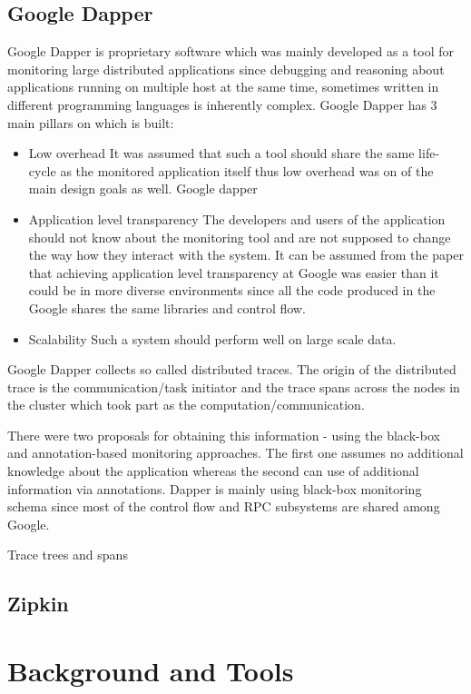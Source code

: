 \subsection{Google Dapper}
Google Dapper is proprietary software which was mainly developed as a tool for monitoring large distributed applications since debugging and reasoning about applications running on multiple host at the same time, sometimes written in different programming languages is inherently complex. Google Dapper has 3 main pillars on which is built:
\begin{itemize}
	\item Low overhead
	It was assumed that such a tool should share the same life-cycle as the monitored application itself thus low overhead was on of the main design goals as well. Google dapper 
	\item Application level transparency
	The developers and users of the application should not know about the monitoring tool and are not supposed to change the way how they interact with the system. It can be assumed from the paper that achieving application level transparency at Google was easier than it could be in more diverse environments since all the code produced in the Google shares the same libraries and control flow.
	\item Scalability
	Such a system should perform well on large scale data.
\end{itemize}	
Google Dapper collects so called distributed traces. The origin of the distributed trace is the communication/task initiator and the trace spans across the nodes in the cluster which took part as the computation/communication.
	
There were two proposals for obtaining this information - using the black-box and annotation-based monitoring approaches. The first one assumes no additional knowledge about the application whereas the second can use of additional information via annotations. Dapper is mainly using black-box monitoring schema since most of the control flow and RPC subsystems are shared among Google.
	
	Trace trees and spans


\subsection{Zipkin}

\section{Background and Tools}
